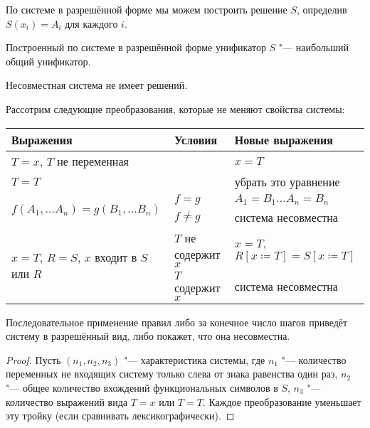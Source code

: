 По системе в разрешённой форме мы можем построить решение $S$, определив $S(x_i) = A_i$ для каждого $i$.

\begin{statement}
    Построенный по системе в разрешённой форме унификатор $S$ "--- наибольший общий унификатор.
\end{statement}

\begin{statement}
    Несовместная система не имеет решений.
\end{statement}

Рассотрим следующие преобразования, которые не меняют свойства системы:
\begin{center}
\begin{tabular}{l l l} \toprule
    Выражения                         & Условия             & Новые выражения \\ \midrule
    $T=x$, $T$ не переменная          &                     & $x=T$ \\ \midrule
    $T=T$                             &                     & убрать это уравнение \\ \midrule
    \multirow{2}{*}[-\aboverulesep]{$f(A_1, \ldots A_n) = g(B_1, \ldots B_n)$}
                                      & $f=g$               & $ A_1 = B_1 \ldots A_n = B_n$ \\ \cmidrule{2-3}
                                      & $f \neq g$          & система несовместна \\ \midrule
    \multirow{2}{*}[-\aboverulesep]{$x=T$, $R=S$, $x$ входит в $S$ или $R$}
                                      & $T$ не содержит $x$ & $x=T$,
                                        $R\left[x\coloneqq T\right]=S\left[x\coloneqq T\right]$\\ \cmidrule{2-3}
                                      & $T$ содержит $x$    & система несовместна \\ \bottomrule
\end{tabular}
\end{center}

\begin{statement}
    Последовательное применение правил либо за конечное число шагов приведёт систему в разрешённый вид, либо покажет, что она несовместна.
\end{statement}

\begin{proof}
    Пусть $(n_1, n_2, n_3)$ "--- характеристика системы, где
    $n_1$ "--- количество переменных не входящих систему только слева от знака равенства один раз,
    $n_2$ "--- общее количество вхождений функциональных символов в $S$,
    $n_3$ "--- количество выражений вида $T=x$ или $T=T$.
    Каждое преобразование уменьшает эту тройку (если сравнивать лексикографически).
\end{proof}

